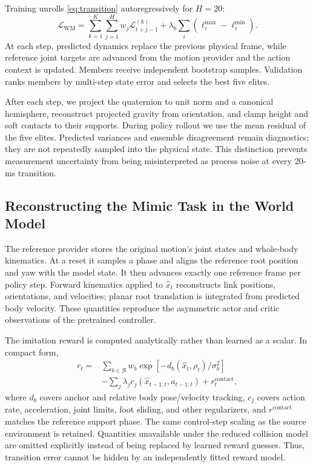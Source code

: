 \documentclass[10pt,twocolumn]{article}
\newcommand{\cL}{\mathcal{L}}
\begin{document}
Training unrolls \cref{eq:transition} autoregressively for $H=20$:
\begin{equation}
\cL_{\mathrm{WM}}=\sum_{k=1}^{K}\sum_{j=1}^{H}w_j\cL_{t+j-1}^{(k)}
+\lambda_b\sum_i(\ell_i^{\max}-\ell_i^{\min}).
\label{eq:multistep-loss}
\end{equation}
At each step, predicted dynamics replace the previous physical frame, while reference joint targets are advanced from the motion provider and the action context is updated. Members receive independent bootstrap samples. Validation ranks members by multi-step state error and selects the best five elites.

After each step, we project the quaternion to unit norm and a canonical hemisphere, reconstruct projected gravity from orientation, and clamp height and soft contacts to their supports. During policy rollout we use the mean residual of the five elites. Predicted variances and ensemble disagreement remain diagnostics; they are not repeatedly sampled into the physical state. This distinction prevents measurement uncertainty from being misinterpreted as process noise at every 20-ms transition.

\subsection{Reconstructing the Mimic Task in the World Model}
\label{sec:mimic}

The reference provider stores the original motion's joint states and whole-body kinematics. At a reset it samples a phase and aligns the reference root position and yaw with the model state. It then advances exactly one reference frame per policy step. Forward kinematics applied to $\hat x_t$ reconstructs link positions, orientations, and velocities; planar root translation is integrated from predicted body velocity. These quantities reproduce the asymmetric actor and critic observations of the pretrained controller.

The imitation reward is computed analytically rather than learned as a scalar. In compact form,
\begin{align}
r_t={}&\sum_{b\in\mathcal{B}}w_b
\exp[-d_b(\hat x_t,\rho_t)/\sigma_b^2]\nonumber\\
&-\sum_j\lambda_j c_j(\hat x_{t-1:t},a_{t-1:t})
+r_t^{\mathrm{contact}},
\label{eq:reward}
\end{align}
where $d_b$ covers anchor and relative body pose/velocity tracking, $c_j$ covers action rate, acceleration, joint limits, foot sliding, and other regularizers, and $r^{\mathrm{contact}}$ matches the reference support phase. The same control-step scaling as the source environment is retained. Quantities unavailable under the reduced collision model are omitted explicitly instead of being replaced by learned reward guesses. Thus, transition error cannot be hidden by an independently fitted reward model.
\end{document}

